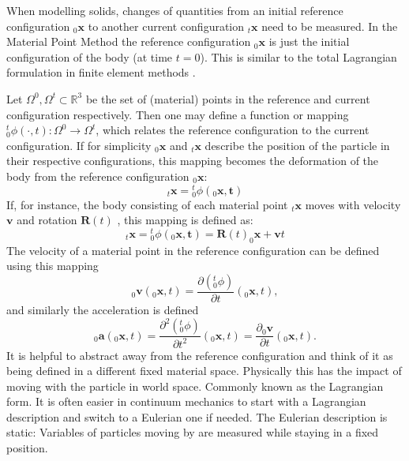 \documentclass[m,times]{cgMA}
\begin{document}
When modelling solids, changes of quantities from an initial reference configuration $_0\boldsymbol{x}$ to another current configuration $_t\boldsymbol{x}$ need to be measured. In the Material Point Method the reference configuration $_0\boldsymbol{x}$ is just the initial configuration of the body (at time $t=0$). This is similar to the total Lagrangian formulation in finite element methods \cite{bathe2006finite}.

Let $\Omega ^ { 0 } , \Omega ^ { t } \subset \mathbb { R } ^ {  { 3 } }$ be the set of (material) points in the reference and current configuration respectively.  Then one may define a function or mapping ${^t_0}\phi ( \cdot , t ) : \Omega ^ { 0 } \rightarrow \Omega ^ { t }$, which relates the reference configuration to the current configuration. If for simplicity $_0\boldsymbol{x}$ and $_t\boldsymbol{{x}}$ describe the position of the particle in their respective configurations, this mapping becomes the deformation of the body from the reference configuration $_0\boldsymbol{x}$:
\begin{equation}
  _t\boldsymbol{x} =  {^t_0}\phi ( _0\boldsymbol{x} , \boldsymbol { t } )
\end{equation}
If, for instance, the body consisting of each material point $_t\boldsymbol{x}$ moves with velocity $\boldsymbol{v}$ and rotation $\boldsymbol{R}(t)$ , this mapping is defined as:
\begin{equation}\label{eq:rigid}
  _t\boldsymbol{{x}} = {^t_0}\phi ( _0\boldsymbol{x} , \boldsymbol { t } ) = \boldsymbol{R}(t)_0\boldsymbol{x}+\boldsymbol{v}t
\end{equation}
The velocity of a material point in the reference configuration can be defined using this mapping
\begin{equation}\label{eq:velocity}
  _0\boldsymbol{v}(_0\boldsymbol{x},t) = \frac{\partial ({^t_0}\phi)}{\partial t}(_0\boldsymbol{x},t),
\end{equation}
and similarly the acceleration is defined
\begin{equation}
  _0\boldsymbol{a}(_0\boldsymbol{x},t) = \frac{\partial^2 ({^t_0}\phi)}{\partial t^2}(_0\boldsymbol{x},t) = \frac{\partial _0\boldsymbol{v}}{\partial t}(_0\boldsymbol{x},t).
\end{equation}
It is helpful to abstract away from the reference configuration and think of it as being defined in a different fixed material space. Physically this has the impact of moving with the particle in world space. Commonly known as the Lagrangian form. It is often easier in continuum mechanics to start with a Lagrangian description and switch to a Eulerian one if needed. The Eulerian description is static: Variables of particles moving by are measured while staying in a fixed position.
\end{document}

